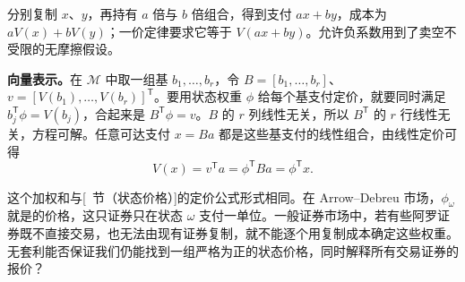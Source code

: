 \begin{solution}[label-content={证明},blank-type=none]
分别复制 $x$、$y$，再持有 $a$ 倍与 $b$ 倍组合，得到支付 $ax+by$，成本为 $aV(x)+bV(y)$；一价定律要求它等于 $V(ax+by)$。允许负系数用到了卖空不受限的无摩擦假设。

\textbf{向量表示。}在 $\mathcal M$ 中取一组基 $b_1,\ldots,b_r$，令 $B=[b_1,\ldots,b_r]$、$v=[V(b_1),\ldots,V(b_r)]^{\mathsf T}$。要用状态权重 $\phi$ 给每个基支付定价，就要同时满足 $b_j^{\mathsf T}\phi=V(b_j)$，合起来是 $B^{\mathsf T}\phi=v$。$B$ 的 $r$ 列线性无关，所以 $B^{\mathsf T}$ 的 $r$ 行线性无关，方程可解。任意可达支付 $x=Ba$ 都是这些基支付的线性组合，由线性定价可得
\[
 V(x)=v^{\mathsf T}a=\phi^{\mathsf T}Ba=\phi^{\mathsf T}x.
\]
\end{solution}

这个加权和与[~节（状态价格）]的定价公式形式相同。在 Arrow--Debreu 市场，$\phi_\omega$ 就是的价格，这只证券只在状态 $\omega$ 支付一单位。一般证券市场中，若有些阿罗证券既不直接交易，也无法由现有证券复制，就不能逐个用复制成本确定这些权重。无套利能否保证我们仍能找到一组严格为正的状态价格，同时解释所有交易证券的报价？

